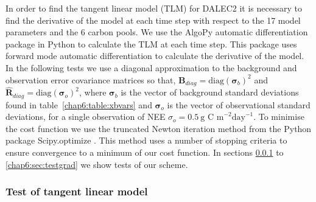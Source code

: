 In order to find the tangent linear model (TLM) for DALEC2 it is necessary to find the derivative of the model at each time step with respect to the 17 model parameters and the 6 carbon pools. We use the AlgoPy automatic differentiation package \citep{Walter2013} in Python to calculate the TLM at each time step. This package uses forward mode automatic differentiation to calculate the derivative of the model. In the following tests we use a diagonal approximation to the background and observation error covariance matrices so that, 
$\textbf{B}_{diag}=\text{diag}(\bm{\sigma}_b)^2$ and $\hat{\textbf{R}}_{diag}=\text{diag}(\bm{\sigma}_o )^2$,
where $\bm{\sigma}_b$ is the vector of background standard deviations found in table~\ref{chap6:table:xbvars} and $\bm{\sigma}_o$ is the vector of observational standard deviations, for a single observation of NEE $\sigma_o=0.5~\text{g C m}^{-2}\text{day}^{-1}$. To minimise the cost function we use the truncated Newton iteration method \citep{Nocedal1999} from the Python package Scipy.optimize \citep{scipy2015}. This method uses a number of stopping criteria to ensure convergence to a minimum of our cost function. In sections \ref{chap6:sec:testtlm} to \ref{chap6:sec:testgrad} we show tests of our scheme. 


\subsubsection{Test of tangent linear model} \label{chap6:sec:testtlm}

